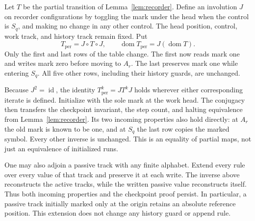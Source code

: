 \documentclass[11pt]{article}
\theoremstyle{remark}
\newcommand{\id}{\operatorname{id}}
\begin{document}
Let $T$ be the partial transition of Lemma~\ref{lem:recorder}. Define an
involution $J$ on recorder configurations by toggling the mark under the
head when the control is $S_q$, and making no change in any other control.
The head position, control, work track, and history track remain fixed. Put
\begin{equation}\label{eq:conjugacy}
 T_{\mathrm{per}}=J\circ T\circ J,
 \qquad \operatorname{dom}T_{\mathrm{per}}=J(\operatorname{dom}T).
\end{equation}
Only the first and last rows of the table change. The first now reads mark
one and writes mark zero before moving to $A_r$. The last preserves mark
one while entering $S_q$. All five other rows, including their history
guards, are unchanged.

Because $J^2=\id$, the identity
$T_{\mathrm{per}}^k=J T^k J$ holds wherever either corresponding iterate
is defined. Initialize with the sole mark at the work head. The conjugacy
then transfers the checkpoint invariant, the step count, and halting
equivalence from Lemma~\ref{lem:recorder}. Its two incoming properties also
hold directly: at $A_r$ the old mark is known to be one, and at $S_q$ the
last row copies the marked symbol. Every other inverse is unchanged.
This is an equality of partial maps, not just an equivalence of initialized
runs.

One may also adjoin a passive track with any finite alphabet. Extend every
rule over every value of that track and preserve it at each write. The
inverse above reconstructs the active tracks, while the written passive
value reconstructs itself. Thus both incoming properties and the checkpoint
proof persist. In particular, a passive track initially marked only at the
origin retains an absolute reference position. This extension does not
change any history guard or append rule.
\end{document}
